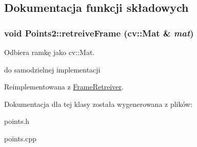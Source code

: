 \subsection{Dokumentacja funkcji składowych}
\hypertarget{class_points2_f46dd0cd21f73b3214d5f766349b8450}{
\subsubsection[{retreiveFrame}]{\setlength{\rightskip}{0pt plus 5cm}void Points2::retreiveFrame (cv::Mat \& {\em mat})}}
\label{class_points2_f46dd0cd21f73b3214d5f766349b8450}


Odbiera ramkę jako cv::Mat. 

do samodzielnej implementacji 

Reimplementowana z \hyperlink{class_frame_retreiver_72912583af45c00d267f215a0d0b9bb1}{FrameRetreiver}.

Dokumentacja dla tej klasy została wygenerowana z plików:\begin{CompactItemize}
\item 
points.h\item 
points.cpp\end{CompactItemize}
